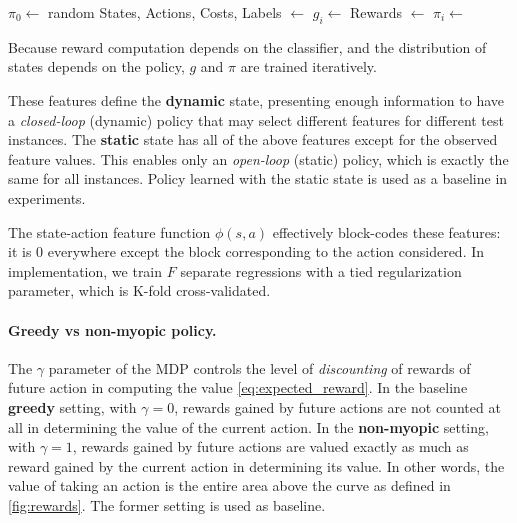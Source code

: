 \begin{algorithm}[]

\SetAlgoLined
{}
\BlankLine
$\pi_0 \leftarrow$ random\;
 {
    States, Actions, Costs, Labels $\leftarrow$ \;
    $g_i \leftarrow$ \;
    Rewards $\leftarrow$ \;
    $\pi_i \leftarrow$ \;
}
\caption{Because reward computation depends on the classifier, and the distribution of states depends on the policy, $g$ and $\pi$ are trained iteratively.\label{alg:learning}}
\end{algorithm}

These features define the \textbf{dynamic} state, presenting enough information to have a \emph{closed-loop} (dynamic) policy that may select different features for different test instances.
The \textbf{static} state has all of the above features except for the observed feature values.
This enables only an \emph{open-loop} (static) policy, which is exactly the same for all instances.
Policy learned with the static state is used as a baseline in experiments.

The state-action feature function $\phi(s, a)$ effectively block-codes these features: it is $0$ everywhere except the block corresponding to the action considered.
In implementation, we train $F$ separate regressions with a tied regularization parameter, which is K-fold cross-validated.

\paragraph{Greedy vs non-myopic policy.}
The $\gamma$ parameter of the MDP controls the level of \emph{discounting} of rewards of future action in computing the value \eqref{eq:expected_reward}.
In the baseline \textbf{greedy} setting, with $\gamma=0$, rewards gained by future actions are not counted at all in determining the value of the current action.
In the \textbf{non-myopic} setting, with $\gamma=1$, rewards gained by future actions are valued exactly as much as reward gained by the current action in determining its value.
In other words, the value of taking an action is the entire area above the curve as defined in \autoref{fig:rewards}.
The former setting is used as baseline.

